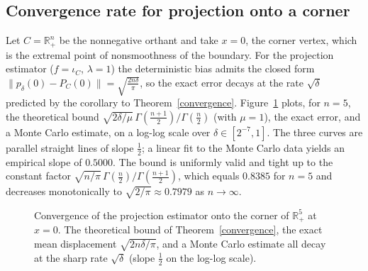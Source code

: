 \documentclass[11pt]{article}
\newcommand{\1}{\mathds{1}}
\theoremstyle{definition}
\theoremstyle{remark}
\theoremstyle{definition}
\begin{document}
\subsection{Convergence rate for projection onto a corner}
Let $C=\mathbb{R}^n_+$ be the nonnegative orthant and take $x=0$, the corner vertex, which is the extremal point of nonsmoothness of the boundary. For the projection estimator ($f=\iota_C$, $\lambda=1$) the deterministic bias admits the closed form $\|p_\delta(0)-P_C(0)\|=\sqrt{\frac{2n\delta}{\pi}}$, so the exact error decays at the rate $\sqrt{\delta}$ predicted by the corollary to Theorem~\ref{convergence}. Figure~\ref{fig:rate} plots, for $n=5$, the theoretical bound $\sqrt{2\delta/\mu}\,\Gamma(\tfrac{n+1}{2})/\Gamma(\tfrac n2)$ (with $\mu=1$), the exact error, and a Monte Carlo estimate, on a log-log scale over $\delta\in[2^{-7},1]$. The three curves are parallel straight lines of slope $\tfrac12$; a linear fit to the Monte Carlo data yields an empirical slope of $0.5000$. The bound is uniformly valid and tight up to the constant factor $\sqrt{n/\pi}\,\Gamma(\tfrac n2)/\Gamma(\tfrac{n+1}{2})$, which equals $0.8385$ for $n=5$ and decreases monotonically to $\sqrt{2/\pi}\approx 0.7979$ as $n\to\infty$.

\begin{figure}[ht]
\centering
{}
\caption{Convergence of the projection estimator onto the corner of $\mathbb{R}^5_+$ at $x=0$. The theoretical bound of Theorem~\ref{convergence}, the exact mean displacement $\sqrt{2n\delta/\pi}$, and a Monte Carlo estimate all decay at the sharp rate $\sqrt\delta$ (slope $\tfrac12$ on the log-log scale).}
\label{fig:rate}
\end{figure}
\end{document}
